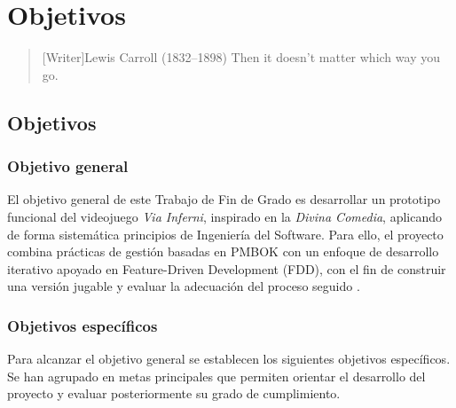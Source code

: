 \chapter{Objetivos}

\begin{quotation}[Writer]{Lewis Carroll (1832--1898)}
Then it doesn’t matter which way you go.
\end{quotation}

\begin{abstract}
Este capítulo define los objetivos del Trabajo de Fin de Grado. Se establece una meta
general para el proyecto y se concretan los objetivos específicos que guían la gestión, el
desarrollo técnico y la validación del prototipo.
\end{abstract}

\section{Objetivos}

\subsection{Objetivo general}

El objetivo general de este Trabajo de Fin de Grado es desarrollar un prototipo funcional
del videojuego \textit{Via Inferni}, inspirado en la \textit{Divina Comedia}, aplicando de
forma sistemática principios de Ingeniería del Software. Para ello, el proyecto combina
prácticas de gestión basadas en PMBOK con un enfoque de desarrollo iterativo apoyado en
Feature-Driven Development (FDD), con el fin de construir una versión jugable y evaluar la
adecuación del proceso seguido \cite{pmbok2021,palmer2002fdd}.

\subsection{Objetivos específicos}

Para alcanzar el objetivo general se establecen los siguientes objetivos específicos. Se
han agrupado en metas principales que permiten orientar el desarrollo del proyecto y
evaluar posteriormente su grado de cumplimiento.

